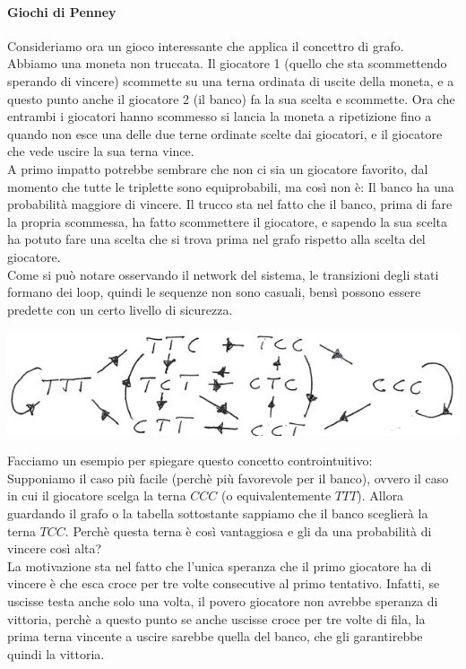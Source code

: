 \documentclass[12pt]{article}
\begin{document}
\paragraph*{Giochi di Penney \\}
Consideriamo ora un gioco interessante che applica il concettro di grafo. \\
Abbiamo una moneta non truccata. Il giocatore 1 (quello che sta scommettendo sperando di vincere) scommette su una terna ordinata di uscite della moneta, e a questo punto anche il giocatore 2 (il banco) fa la sua scelta e scommette. Ora che entrambi i giocatori hanno scommesso si lancia la moneta a ripetizione fino a quando non esce una delle due terne ordinate scelte dai giocatori, e il giocatore che vede uscire la sua terna vince. \\
A primo impatto potrebbe sembrare che non ci sia un giocatore favorito, dal momento che tutte le triplette sono equiprobabili, ma così non è: Il banco ha una probabilità maggiore di vincere. Il trucco sta nel fatto che il banco, prima di fare la propria scommessa, ha fatto scommettere il giocatore, e sapendo la sua scelta ha potuto fare una scelta che si trova prima nel grafo rispetto alla scelta del giocatore. \\
Come si può notare osservando il network del sistema, le transizioni degli stati formano dei loop, quindi le sequenze non sono casuali, bensì possono essere predette con un certo livello di sicurezza. 
\begin{center}
	\includegraphics[scale=1]{Scam della moneta}
\end{center} 
Facciamo un esempio per spiegare questo concetto controintuitivo: \\
Supponiamo il caso più facile (perchè più favorevole per il banco), ovvero il caso in cui il giocatore scelga la terna $CCC$ (o equivalentemente $TTT$). Allora guardando il grafo o la tabella sottostante sappiamo che il banco sceglierà la terna $TCC$. Perchè questa terna è così vantaggiosa e gli da una probabilità di vincere così alta? \\
La motivazione sta nel fatto che l'unica speranza che il primo giocatore ha di vincere è che esca croce per tre volte consecutive al primo tentativo. Infatti, se uscisse testa anche solo una volta, il povero giocatore non avrebbe speranza di vittoria, perchè a questo punto se anche uscisse croce per tre volte di fila, la prima terna vincente a uscire sarebbe quella del banco, che gli garantirebbe quindi la vittoria. \\
\end{document}
